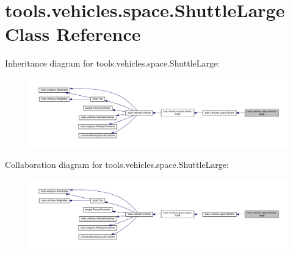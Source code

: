\hypertarget{classtools_1_1vehicles_1_1space_1_1_shuttle_large}{}\section{tools.\+vehicles.\+space.\+Shuttle\+Large Class Reference}
\label{classtools_1_1vehicles_1_1space_1_1_shuttle_large}


Inheritance diagram for tools.\+vehicles.\+space.\+Shuttle\+Large\+:
\nopagebreak
\begin{figure}[H]
\begin{center}
\leavevmode
\includegraphics[width=350pt]{classtools_1_1vehicles_1_1space_1_1_shuttle_large__inherit__graph}
\end{center}
\end{figure}


Collaboration diagram for tools.\+vehicles.\+space.\+Shuttle\+Large\+:
\nopagebreak
\begin{figure}[H]
\begin{center}
\leavevmode
\includegraphics[width=350pt]{classtools_1_1vehicles_1_1space_1_1_shuttle_large__coll__graph}
\end{center}
\end{figure}

